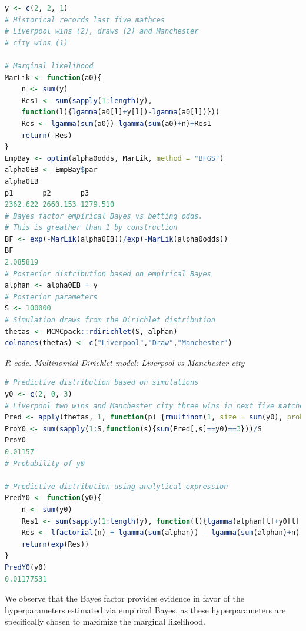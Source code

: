 \begin{enumerate}
\begin{tcolorbox}[enhanced,width=4.67in,center upper,
	fontupper=\large\bfseries,drop shadow southwest,sharp corners]
\begin{VF}
\begin{lstlisting}[language=R]
y <- c(2, 2, 1) 
# Historical records last five mathces
# Liverpool wins (2), draws (2) and Manchester
# city wins (1)

# Marginal likelihood
MarLik <- function(a0){
	n <- sum(y)
	Res1 <- sum(sapply(1:length(y), 
	function(l){lgamma(a0[l]+y[l])-lgamma(a0[l])}))
	Res <- lgamma(sum(a0))-lgamma(sum(a0)+n)+Res1
	return(-Res)
}
EmpBay <- optim(alpha0odds, MarLik, method = "BFGS")
alpha0EB <- EmpBay$par
alpha0EB
p1       p2       p3 
2362.622 2660.153 1279.510 
# Bayes factor empirical Bayes vs betting odds. 
# This is greather than 1 by construction
BF <- exp(-MarLik(alpha0EB))/exp(-MarLik(alpha0odds))
BF
2.085819
# Posterior distribution based on empirical Bayes
alphan <- alpha0EB + y 
# Posterior parameters 
S <- 100000
# Simulation draws from the Dirichlet distribution 
thetas <- MCMCpack::rdirichlet(S, alphan)
colnames(thetas) <- c("Liverpool","Draw","Manchester")
\end{lstlisting}
\end{VF}
\end{tcolorbox}


\begin{tcolorbox}[enhanced,width=4.67in,center upper,
	fontupper=\large\bfseries,drop shadow southwest,sharp corners]
	\textit{R code. Multinomial-Dirichlet model: Liverpool vs Manchester city}
\begin{VF}
\begin{lstlisting}[language=R]
# Predictive distribution based on simulations
y0 <- c(2, 0, 3) 
# Liverpool two wins and Manchester city three wins in next five matches
Pred <- apply(thetas, 1, function(p) {rmultinom(1, size = sum(y0), prob = p)})
ProY0 <- sum(sapply(1:S,function(s){sum(Pred[,s]==y0)==3}))/S
ProY0
0.01157
# Probability of y0

# Predictive distribution using analytical expression
PredY0 <- function(y0){
	n <- sum(y0)
	Res1 <- sum(sapply(1:length(y), function(l){lgamma(alphan[l]+y0[l]) - lgamma(alphan[l])-lfactorial(y0[l])}))
	Res <- lfactorial(n) + lgamma(sum(alphan)) - lgamma(sum(alphan)+n) + Res1
	return(exp(Res))
}
PredY0(y0)         
0.01177531
\end{lstlisting}
\end{VF}
\end{tcolorbox}

We observe that the Bayes factor provides evidence in favor of the hyperparameters estimated via empirical Bayes, as these hyperparameters are specifically chosen to maximize the marginal likelihood.


\end{enumerate}
